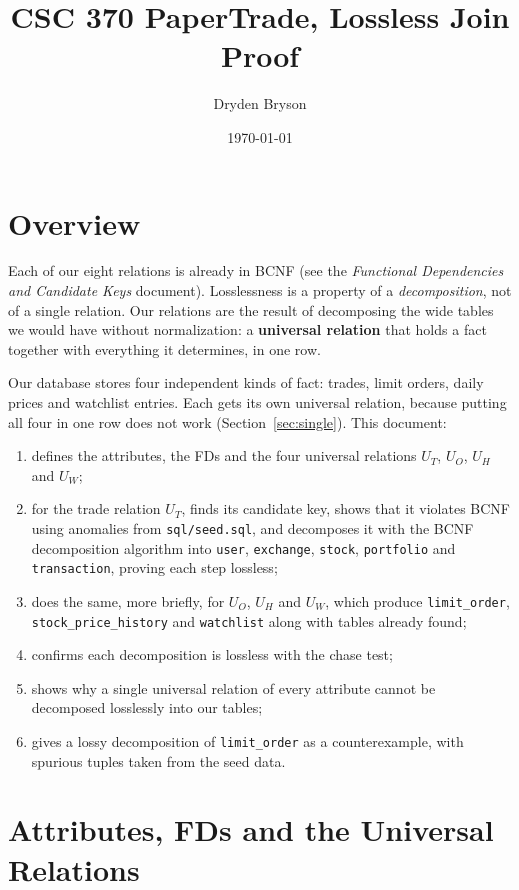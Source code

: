 \documentclass{article}
\title{CSC 370 PaperTrade, Lossless Join Proof}
\author{Dryden Bryson}
\date{\today}
\begin{document}
\maketitle
\newpage

\section*{Overview}

Each of our eight relations is already in BCNF (see the \emph{Functional Dependencies and Candidate Keys} document). Losslessness is a property of a \emph{decomposition}, not of a single relation. Our relations are the result of decomposing the wide tables we would have without normalization: a \textbf{universal relation} that holds a fact together with everything it determines, in one row.

Our database stores four independent kinds of fact: trades, limit orders, daily prices and watchlist entries. Each gets its own universal relation, because putting all four in one row does not work (Section~\ref{sec:single}). This document:
\begin{enumerate}[leftmargin=*]
  \item defines the attributes, the FDs and the four universal relations $U_T$, $U_O$, $U_H$ and $U_W$;
  \item for the trade relation $U_T$, finds its candidate key, shows that it violates BCNF using anomalies from \texttt{sql/seed.sql}, and decomposes it with the BCNF decomposition algorithm into \texttt{user}, \texttt{exchange}, \texttt{stock}, \texttt{portfolio} and \texttt{transaction}, proving each step lossless;
  \item does the same, more briefly, for $U_O$, $U_H$ and $U_W$, which produce \texttt{limit\_order}, \texttt{stock\_price\_history} and \texttt{watchlist} along with tables already found;
  \item confirms each decomposition is lossless with the chase test;
  \item shows why a single universal relation of every attribute cannot be decomposed losslessly into our tables;
  \item gives a lossy decomposition of \texttt{limit\_order} as a counterexample, with spurious tuples taken from the seed data.
\end{enumerate}

\section{Attributes, FDs and the Universal Relations}
\end{document}
